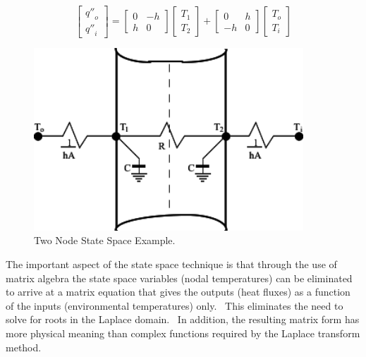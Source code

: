 \begin{equation}
\left[\begin{array}{c}{q''}_o \\ {q''}_i\end{array}\right] = 
    \left[\begin{array}{cc}0 & -h \\ h & 0\end{array}\right] \left[\begin{array}{c}T_1 \\ T_2\end{array}\right] +
    \left[\begin{array}{cc}0 & h \\ -h & 0\end{array}\right] \left[\begin{array}{c}T_o \\ T_i\end{array}\right]
\end{equation}

\begin{figure}[hbtp] %
\centering
\includegraphics[width=0.9\textwidth, height=0.9\textheight, keepaspectratio=true]{media/image168.svg.png}
\caption{Two Node State Space Example. \protect \label{fig:two-node-state-space-example.}}
\end{figure}

The important aspect of the state space technique is that through the use of matrix algebra the state space variables (nodal temperatures) can be eliminated to arrive at a matrix equation that gives the outputs (heat fluxes) as a function of the inputs (environmental temperatures) only.~ This eliminates the need to solve for roots in the Laplace domain.~ In addition, the resulting matrix form has more physical meaning than complex functions required by the Laplace transform method.

